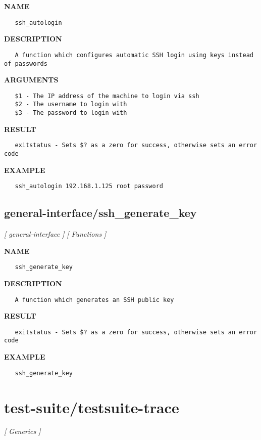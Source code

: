 \label{ch:robo38}
\label{ch:general_interface_ssh_autologin}
\textbf{NAME}
\begin{verbatim}
   ssh_autologin
\end{verbatim}
\textbf{DESCRIPTION}
\begin{verbatim}
   A function which configures automatic SSH login using keys instead of passwords
\end{verbatim}
\textbf{ARGUMENTS}
\begin{verbatim}
   $1 - The IP address of the machine to login via ssh
   $2 - The username to login with
   $3 - The password to login with
\end{verbatim}
\textbf{RESULT}
\begin{verbatim}
   exitstatus - Sets $? as a zero for success, otherwise sets an error code
\end{verbatim}
\textbf{EXAMPLE}
\begin{verbatim}
   ssh_autologin 192.168.1.125 root password
\end{verbatim}
\newpage
\subsection{general-interface/ssh\_generate\_key}
\textsl{[ general-interface ]}
\textsl{[ Functions ]}

\label{ch:robo39}
\label{ch:general_interface_ssh_generate_key}
\textbf{NAME}
\begin{verbatim}
   ssh_generate_key
\end{verbatim}
\textbf{DESCRIPTION}
\begin{verbatim}
   A function which generates an SSH public key
\end{verbatim}
\textbf{RESULT}
\begin{verbatim}
   exitstatus - Sets $? as a zero for success, otherwise sets an error code
\end{verbatim}
\textbf{EXAMPLE}
\begin{verbatim}
   ssh_generate_key
\end{verbatim}
\newpage
\section{test-suite/testsuite-trace}
\textsl{[ Generics ]}

